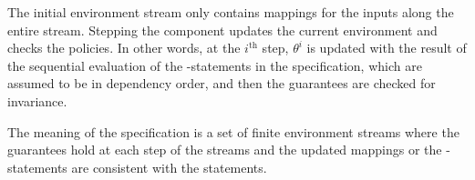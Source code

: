 The initial environment stream only contains mappings for the inputs along the entire stream. Stepping the component updates the current environment and checks the policies. In other words, at the $i^\mathrm{th}$ step, $\theta^i$ is updated with the result of the sequential evaluation of the -statements in the specification, which are assumed to be in dependency order, and then the guarantees are checked for invariance. 

The meaning of the specification is a set of finite environment streams where the guarantees hold at each step of the streams and the updated mappings or the -statements are consistent with the statements.

\begin{comment}
  A \emph{system} is a collection of \emph{components}, \emph{connections} between components, a \emph{scheduler} to order execution, and a \emph{system environment} for primary inputs. The computation for the component in this work is defined entirely by a step function:
\[
\konst{stepFn} : \mathit{inports} \times \mathit{stateVars} \to \mathit{stateVars}
\]
The scheduler \emph{activates} components in some order. Activating a component is defined as follows: 
\[
\begin{array}{ll}
 \mathit{inportVals} & = \konst{readInputs}(); \\
 (v_1,\ldots,v_k) & = \konst{readState}() ; \\
 ({v_1}',\ldots,{v_k}') & = \konst{stepFn} (\mathit{inportVals},\mathit{stateVars}) ; \\
 \multicolumn{2}{l}{\konst{writeState}({v_1}',\ldots,{v_k}');} \\
 \multicolumn{2}{l}{\konst{writeOutputs}({v_1}',\ldots,{v_k}');} \\
\end{array}
\]
It is assumed that the scheduler follows some sensible partial order of component activation and allows each component sufficient time for its computation.
\end{comment}